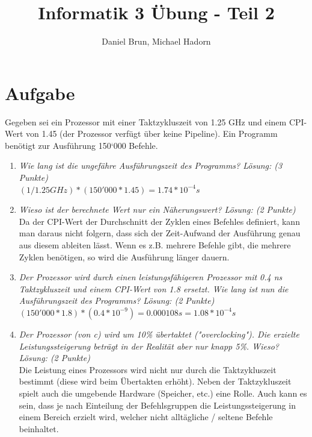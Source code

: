 \documentclass[10pt]{article}
\title{Informatik 3 Übung - Teil 2\vspace{-2ex}}
\author{Daniel Brun, Michael Hadorn\vspace{-2ex}}
\begin{document}
\maketitle

\section{Aufgabe}
Gegeben sei ein Prozessor mit einer Taktzykluszeit von 1.25 GHz und einem CPI-Wert von 1.45 (der Prozessor verfügt über keine Pipeline). Ein Programm benötigt zur Ausführung 150‘000 Befehle.

\begin{enumerate}[label=\alph*)]
	\item 
	\textit{Wie lang ist die ungefähre Ausführungszeit des	Programms? Lösung: (3 Punkte)}\\
	$ (1 / 1.25 GHz)*(150'000 * 1.45) = 1.74 * 10^{-4} s$
	
	\item
	\textit{Wieso ist der berechnete Wert nur ein Näherungswert? Lösung: (2 Punkte)}\\
	Da der CPI-Wert der Durchschnitt der Zyklen eines Befehles definiert, kann man daraus nicht folgern, dass sich der Zeit-Aufwand der Ausführung genau aus diesem ableiten lässt. Wenn es z.B. mehrere Befehle gibt, die mehrere Zyklen benötigen, so wird die Ausführung länger dauern.
	\item
	\textit{Der Prozessor wird durch einen leistungsfähigeren Prozessor mit 0.4 ns Taktzykluszeit und einem CPI-Wert von 1.8 ersetzt. Wie lang ist nun die Ausführungszeit des Programms? Lösung: (2 Punkte)}\\
	
	$ (150'000*1.8)*(0.4*10^{-9}) = 0.000108 s = 1.08 * 10^{-4} s$\\

			
	\item
	\textit{Der Prozessor (von c) wird um 10\% übertaktet ("overclocking"). Die erzielte Leistungssteigerung beträgt in der Realität aber nur knapp 5\%. Wieso? 	Lösung: (2 Punkte)}\\
	
	Die Leistung eines Prozessors wird nicht nur durch die Taktzykluszeit bestimmt (diese wird beim Übertakten erhöht). Neben der Taktzykluszeit spielt auch die umgebende Hardware (Speicher, etc.) eine Rolle. Auch kann es sein, dass je nach Einteilung der Befehlsgruppen die Leistungssteigerung in einem Bereich erzielt wird, welcher nicht alltägliche / seltene Befehle beinhaltet.
	
\end{enumerate}
\newpage
\end{document}
